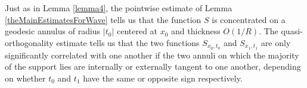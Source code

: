 
\begin{remark}
    Just as in Lemma \ref{lemma4}, the pointwise estimate of Lemma \ref{theMainEstimatesForWave} tells us that the function $S$ is concentrated on a geodesic annulus of radius $|t_0|$ centered at $x_0$ and thickness $O(1/R)$. %
The quasi-orthogonality estimate tells us that the two functions $S\!_{x_0,t_0}$ and $S\!_{x_1,t_1}$ are only significantly correlated with one another if the two annuli on which the majority of the support lies are internally or externally tangent to one another, depending on whether $t_0$ and $t_1$ have the same or opposite sign respectively. %
%
%
\end{remark}



